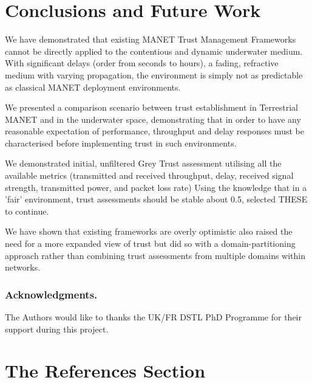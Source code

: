 \documentclass[runningheads,a4paper]{llncs}
\begin{document}
{{\section{Conclusions and Future Work}
We have demonstrated that existing MANET Trust Management Frameworks cannot be directly applied to the contentious and dynamic underwater medium.
With significant delays (order from seconds to hours), a fading, refractive medium with varying propagation, the environment is simply not as predictable as classical MANET deployment environments. 

We presented a comparison scenario between trust establishment in Terrestrial MANET and in the underwater space, demonstrating that in order to have any reasonable expectation of performance, throughput and delay responses must be characterised before implementing trust in such environments. 

We demonstrated initial, unfiltered Grey Trust assessment utilising all the available metrics (transmitted and received throughput, delay, received signal strength, transmitted power, and packet loss rate)
Using the knowledge that in a 'fair' environment, trust assessments should be stable about 0.5, selected  THESE to continue. 

We have shown that existing frameworks are overly optimistic 
 \cite{Huang2010a} also raised the need for a more expanded view of trust but did so with a domain-partitioning approach rather than combining trust assessments from multiple domains within networks.

\subsubsection*{Acknowledgments.} The Authors would like to thanks the UK/FR DSTL PhD Programme for their support during this project.

\section{The References Section}\label{references}

}}
\end{document}
